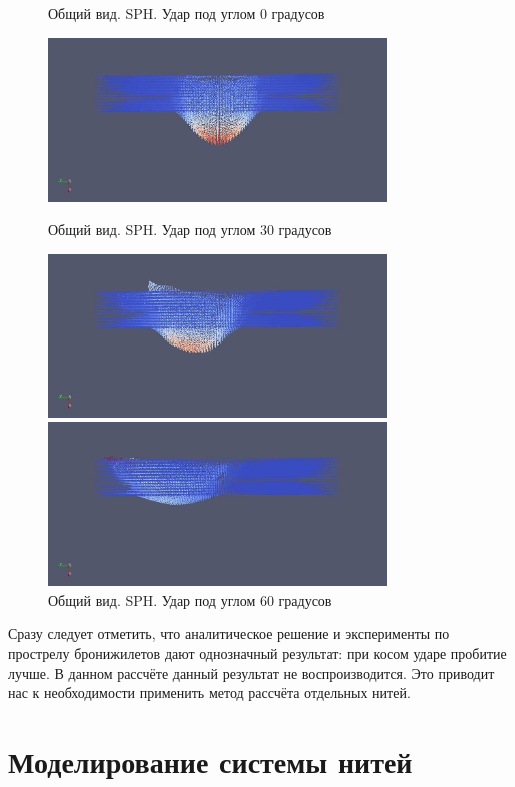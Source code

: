 \begin{figure}[H]
    \centering

    \caption{Общий вид. SPH. Удар под углом 0 градусов}
    \includegraphics[width=0.8\textwidth]{img/sph_0.png}

    \caption{Общий вид. SPH. Удар под углом 30 градусов}
    \includegraphics[width=0.8\textwidth]{img/sph_30.png}

    \caption{Общий вид. SPH. Удар под углом 60 градусов}
    \includegraphics[width=0.8\textwidth]{img/sph_60.png}
\end{figure}

Сразу следует отметить, что аналитическое решение и эксперименты по прострелу бронижилетов дают однозначный результат:
при косом ударе пробитие лучше.
В данном рассчёте данный результат не воспроизводится. Это приводит нас к необходимости применить метод рассчёта
отдельных нитей.

\section*{Моделирование системы нитей}
